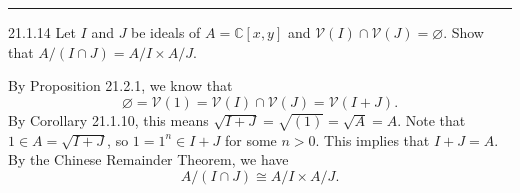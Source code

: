 \documentclass[letterpaper, 12pt]{article}
\begin{document}
\noindent\rule{7in}{2.8pt}
\begin{problem}{21.1.14}
Let \(I\) and \(J\) be ideals of \(A=\mathbb{C}[x,y]\) and \(\mathcal{V}(I)\cap \mathcal{V}(J)=\varnothing\). Show that \(A/(I\cap J)=A/I\times A/J\). 
\end{problem}
\begin{solution}
By Proposition 21.2.1, we know that 
\[\varnothing=\mathcal{V}(1)=\mathcal{V}(I)\cap \mathcal{V}(J)=\mathcal{V}(I+J).\]
By Corollary 21.1.10, this means \(\sqrt{I+J}=\sqrt{(1)}=\sqrt{A}=A\). Note that \(1\in A=\sqrt{I+J}\), so \(1=1^n\in I+J\) for some \(n>0\). This implies that \(I+J=A\). By the Chinese Remainder Theorem, we have 
\[A/(I\cap J)\cong A/I\times A/J.\]
\end{solution}
\end{document}
